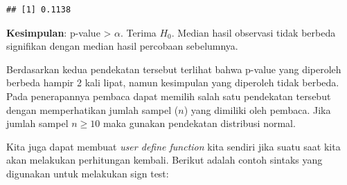 \documentclass[]{book}
\begin{document}
\begin{verbatim}
## [1] 0.1138
\end{verbatim}

\textbf{Kesimpulan}: p-value \textgreater{} \(\alpha\). Terima \(H_0\).
Median hasil observasi tidak berbeda signifikan dengan median hasil
percobaan sebelumnya.

Berdasarkan kedua pendekatan tersebut terlihat bahwa p-value yang
diperoleh berbeda hampir 2 kali lipat, namun kesimpulan yang diperoleh
tidak berbeda. Pada penerapannya pembaca dapat memilih salah satu
pendekatan tersebut dengan memperhatikan jumlah sampel (\(n\)) yang
dimiliki oleh pembaca. Jika jumlah sampel \(n\ge10\) maka gunakan
pendekatan distribusi normal.

Kita juga dapat membuat \emph{user define function} kita sendiri jika
suatu saat kita akan melakukan perhitungan kembali. Berikut adalah
contoh sintaks yang digunakan untuk melakukan sign test:
\end{document}
